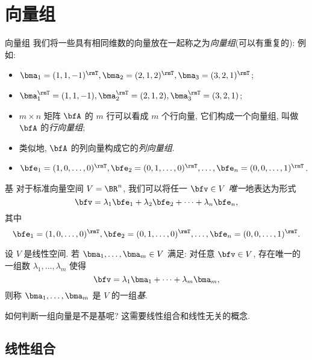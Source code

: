 \section{向量组}


\begin{frame}{向量组}
	\onslide<+->
	我们将一些具有相同维数的向量放在一起称之为\emph{向量组}(可以有重复的):
	\onslide<+->
	例如:
	\begin{itemize}
		\item $\bma_1=(1,1,-1)^\rmT, \bma_2=(2,1,2)^\rmT, \bma_3=(3,2,1)^\rmT$;
		\item $\bma_1^\rmT=(1,1,-1), \bma_2^\rmT=(2,1,2), \bma_3^\rmT=(3,2,1)$;
		\item $m\times n$ 矩阵 $\bfA$ 的 $m$ 行可以看成 $m$ 个行向量, 它们构成一个向量组, 叫做 $\bfA$ 的\emph{行向量组};
		\item 类似地, $\bfA$ 的列向量构成它的\emph{列向量组}.
		\item $\bfe_1=(1,0,\dots,0)^\rmT,\bfe_2=(0,1,\dots,0)^\rmT,\dots,\bfe_n=(0,0,\dots,1)^\rmT$.
	\end{itemize}
\end{frame}


\begin{frame}{基\noexer}
	\onslide<+->
	对于标准向量空间 $V=\BR^n$, 我们可以将任一 $\bfv\in V$ \emph{唯一}地表达为形式
	\[\bfv=\lambda_1\bfe_1+\lambda_2\bfe_2+\cdots+\lambda_n\bfe_n,\]
	\onslide<+->
	其中
	\[\bfe_1=(1,0,\dots,0)^\rmT,\bfe_2=(0,1,\dots,0)^\rmT,\dots,\bfe_n=(0,0,\dots,1)^\rmT.\]
	\onslide<+->
	\begin{definition}
		设 $V$ 是线性空间.
		若 $\bma_1,\dots,\bma_m\in V$ 满足: 对任意 $\bfv\in V$, 存在唯一的一组数 $\lambda_1,\dots,\lambda_m$ 使得
		\[\bfv=\lambda_1\bma_1+\cdots+\lambda_m \bma_m,\]
		则称 $\bma_1,\dots,\bma_m$ 是 $V$ 的一组\emph{基}.
	\end{definition}
	\onslide<+->
	如何判断一组向量是不是基呢?
	\onslide<+->
	这需要线性组合和线性无关的概念.
\end{frame}


\subsection{线性组合}

